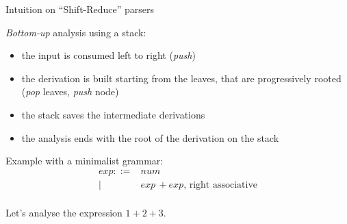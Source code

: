 \documentclass{beamer}          %
\begin{document}
\begin{frame}{Intuition on ``Shift-Reduce'' parsers}

  {\em Bottom-up} analysis using a stack:

  \begin{itemize}
    \item the input is consumed left to right ({\em push})
    \item the derivation is built starting from the leaves,
          that are progressively rooted ({\em pop} leaves, {\em push} node)
    \item the stack saves the intermediate derivations
    \item the analysis ends with the root of the derivation on the stack
  \end{itemize}

  \pause

  Example with a minimalist grammar:
  $$
  \begin{array}{rl}
    exp ::= & num \\
          | & exp\,+ exp \text{, right associative}\\
  \end{array}
  $$

  Let's analyse the expression $1+2+3$.
\end{frame}
\end{document}
